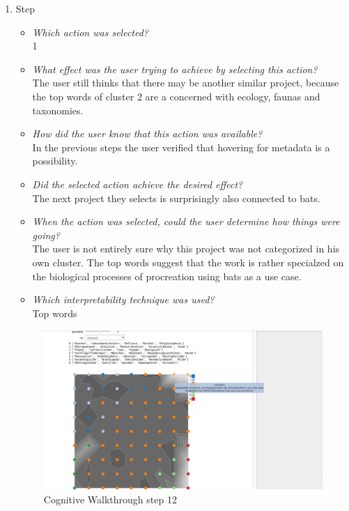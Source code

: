 {\begin{enumerate}
		\item Step
		\begin{itemize}
			\item \textit{Which action was selected?} \\
			1
			\item \textit{What effect was the user trying to achieve by selecting this action?} \\
			The user still thinks that there may be another similar project, because the top words of cluster 2 are a concerned with ecology, faunas and taxonomies. 
			\item \textit{How did the user know that this action was available?} \\
			In the previous steps the user verified that hovering for metadata is a possibility. 
			\item \textit{Did the selected action achieve the desired effect?} \\
			The next project they selects is surprisingly also connected to bats.  
			\item \textit{When the action was selected, could the user determine how things were going?} \\
			The user is not entirely sure why this project was not categorized in his own cluster. The top words suggest that the work is rather specialzed on the biological processes of procreation using bats as a use case. 
			\item \textit{Which interpretability technique was used?}\\
			Top words
		\end{itemize}
		\begin{figure}[H]
			\centering
			\includegraphics[width=400px]{../chapters/validation/pics/10_c}
			\caption{\label{pic:step12} Cognitive Walkthrough step 12}
		\end{figure}
\end{enumerate}}

